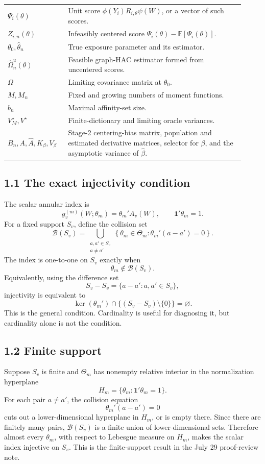 \documentclass[11pt]{article}
\newcommand{\E}{\mathbb{E}}
\begin{document}
\begin{longtable}{>{\raggedright\arraybackslash}p{0.23\linewidth}
                  >{\raggedright\arraybackslash}p{0.69\linewidth}}
\(\Psi_i(\theta)\) & Unit score
\(\phi(Y_i)R_{i,\theta}\psi(W)\), or a vector of such scores. \\
\(Z_{i,n}(\theta)\) & Infeasibly centered score
\(\Psi_i(\theta)-\E[\Psi_i(\theta)]\). \\
\(\theta_0,\widehat\theta_n\) & True exposure parameter and its estimator. \\
\(\widehat\Omega_n^u(\theta)\) & Feasible graph-HAC estimator formed from
uncentered scores. \\
\(\Omega\) & Limiting covariance matrix at \(\theta_0\). \\
\(M,M_n\) & Fixed and growing numbers of moment functions. \\
\(b_n\) & Maximal affinity-set size. \\
\(V_M^\star,V^\star\) & Finite-dictionary and limiting oracle variances. \\
\(B_n,A,\widehat A,K_\beta,V_\beta\) & Stage-2 centering-bias matrix,
population and estimated derivative matrices, selector for \(\beta\), and the
asymptotic variance of \(\widehat\beta\). \\
\bottomrule
\end{longtable}

\subsection*{1.1 The exact injectivity condition}

The scalar annular index is
\[
    g_v^{(m)}(W;\theta_m)=\theta_m'A_v(W),
    \qquad
    \mathbf 1'\theta_m=1.
\]
For a fixed support \(S_v\), define the collision set
\[
    \mathcal B(S_v)
    =
    \bigcup_{\substack{a,a'\in S_v\\a\neq a'}}
    \left\{
       \theta_m\in\Theta_m:
       \theta_m'(a-a')=0
    \right\}.
\]
The index is one-to-one on \(S_v\) exactly when
\[
    \theta_m\notin\mathcal B(S_v).
\]
Equivalently, using the difference set
\[
    S_v-S_v=\{a-a':a,a'\in S_v\},
\]
injectivity is equivalent to
\[
    \ker(\theta_m')\cap
    \{(S_v-S_v)\setminus\{0\}\}
    =
    \varnothing.
\]
This is the general condition. Cardinality is useful for diagnosing it, but
cardinality alone is not the condition.

\subsection*{1.2 Finite support}

Suppose \(S_v\) is finite and \(\Theta_m\) has nonempty relative interior in
the normalization hyperplane
\[
    H_m=\{\theta_m:\mathbf 1'\theta_m=1\}.
\]
For each pair \(a\neq a'\), the collision equation
\[
    \theta_m'(a-a')=0
\]
cuts out a lower-dimensional hyperplane in \(H_m\), or is empty there. Since
there are finitely many pairs, \(\mathcal B(S_v)\) is a finite union of
lower-dimensional sets. Therefore almost every \(\theta_m\), with respect to
Lebesgue measure on \(H_m\), makes the scalar index injective on \(S_v\).
This is the finite-support result in the July 29 proof-review note.
\end{document}
